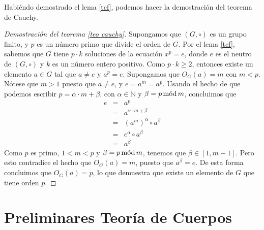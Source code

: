 Habiéndo demostrado el lema \ref{tcf}, podemos hacer la demostración del teorema de Cauchy.
\begin{proof}[Demostración del teorema \ref{teo cauchy}]
Supongamos que $(G,\circ)$ es un grupo finito, y $p$ es un número
primo que divide el orden de $G$. Por el lema \ref{tcf}, sabemos que
$G$ tiene $p\cdot k$ soluciones de la ecuación $x^p=e$, donde $e$ es
el neutro de $(G,\circ)$ y $k$ es un número entero positivo. Como
$p\cdot k \geq 2$, entonces existe un elemento $a\in G$ tal que $a\neq
e$ y $a^p=e$. Supongamos que $O_G(a)=m$ con $m<p$. Nótese que $m > 1$
puesto que $a \neq e$, y $e = a^m = a^p$. Usando el hecho de que
podemos escribir $p=\alpha \cdot m+\beta$, con $\alpha \in \mathbb{N}$
y $\beta = p \mods m$, concluimos que
\begin{eqnarray*}
	e & = & a^p \\
	&=& a^{\alpha \cdot m + \beta}\\
	&=& (a^{m})^{\alpha} \circ a^{\beta}\\
	&=& e^{\alpha}\circ a^{\beta}\\
	&=& a^{\beta}
\end{eqnarray*} 
Como $p$ es primo, $1<m<p$ y $\beta = p \mods m$, tenemos que
$\beta \in [1,m-1]$. Pero esto contradice el hecho que $O_G(a) = m$,
puesto que $a^{\beta}=e$. De esta forma concluimos que $O_G(a) = p$,
lo que demuestra que existe un elemento de $G$ que tiene orden $p$.
\end{proof}



\section{Preliminares Teoría de Cuerpos}
\label{app-cuerpos}
